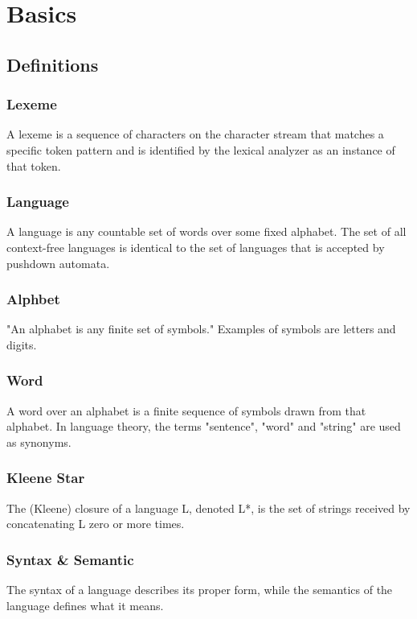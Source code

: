 \chapter{Basics}
\label{cha:basics}
\section{Definitions}
\subsection{Lexeme}
A lexeme is a sequence of characters on the character stream that matches a specific token pattern and is identified by the lexical analyzer as an instance of that token.\cite{DragonBook}

\subsection{Language}
A language is any countable set of words over some fixed alphabet. The set of all context-free languages is identical to the set of languages that is accepted by pushdown automata.\cite{DragonBook}

\subsection{Alphbet}
"An alphabet is any finite set of symbols." Examples of symbols are letters and digits.\cite{DragonBook}

\subsection{Word} 
A word over an alphabet is a finite sequence of symbols drawn from that alphabet. In language theory, the terms "sentence", "word" and "string" are used as synonyms.\cite{DragonBook}

\subsection{Kleene Star} 
The (Kleene) closure of a language L, denoted L*, is the set of strings received by concatenating L zero or more times. \cite{DragonBook}


\subsection{Syntax \& Semantic}  
The syntax of a language describes its proper form, while the semantics of the language defines what it means. \cite{DragonBook}


